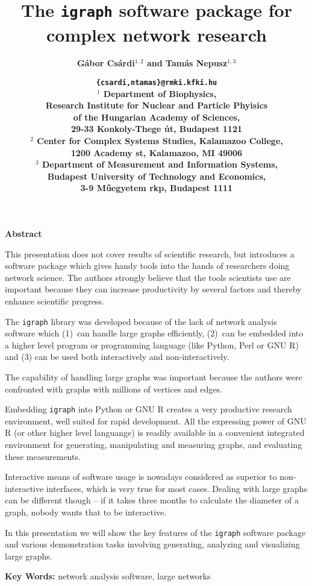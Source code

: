 \documentclass[12pt,letterpaper]{article}
\begin{document}
\author{\bf G\'abor Cs\'ardi$^{1,2}$ and Tam\'as Nepusz$^{1,3}$}
\title{\Large\bf The \texttt{igraph} software package for complex
  network research} 
\date{\bf\normalsize\texttt{\{csardi,ntamas\}@rmki.kfki.hu}\\[15pt]
  $^1$ Department of Biophysics,\\ Research Institute for Nuclear and
  Particle Phyisics \\ of the Hungarian Academy of Sciences, \\
  29-33 Konkoly-Thege \'ut, Budapest 1121\\[10pt]
  $^2$ Center for Complex Systems Studies, Kalamazoo College, \\
  1200 Academy st, Kalamazoo, MI 49006 \\[10pt]
  $^3$ Department of Measurement and Information Systems, \\ Budapest
  University of Technology and Economics, \\
  3-9 M\H{u}egyetem rkp, Budapest 1111
}
\maketitle

\pagestyle{empty}\thispagestyle{empty}
\enlargethispage{5cm}
\centerline{\bf\large Abstract}

\noindent 
This presentation does not cover results of scientific research, but
introduces a software package which gives handy tools into the hands
of researchers doing network science. The authors strongly believe
that the tools scientists use are important because they
can increase productivity by several factors and thereby enhance
scientific progress. 

The \texttt{igraph} library was developed because of the lack of network
analysis software which (1)~can handle large graphs efficiently,
(2)~can be embedded into a higher level program or programming language
(like Python, Perl or GNU R) and (3) can be used both interactively
and non-interactively.

The capability of handling large graphs was important because the
authors were confronted with graphs with millions of vertices and edges. 

Embedding \texttt{igraph} into Python or GNU R creates a very productive
research environment, well suited for rapid development. All the
expressing power of GNU R (or other higher level languange) is readily
available in a convenient integrated environment for generating,
manipulating and measuring graphs, and evaluating these measurements.

Interactive means of software usage is nowadays considered as superior
to non-interactive interfaces, which is very true for most
cases. Dealing with large graphs can be different though -- if it takes
three months to calculate the diameter of a graph, nobody wants that to
be interactive.

In this presentation we will show the key features of the
\texttt{igraph} software package and various demonstration
tasks involving generating, analyzing and visualizing large graphs.

\vspace*{10pt}
\noindent
\textbf{Key Words:} network analysis software, large networks
\end{document}
